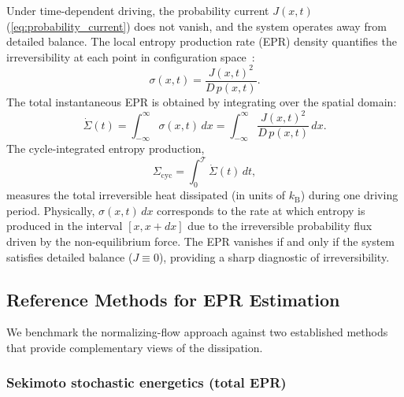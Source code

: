 Under time-dependent driving, the probability current $J(x,t)$ (\cref{eq:probability_current}) does not vanish, and the system operates away from detailed balance.
The local entropy production rate (EPR) density quantifies the irreversibility at each point in configuration space~\cite{Seifert2012}:
\begin{equation}
    \sigma(x,t) = \frac{J(x,t)^2}{D\,p(x,t)}.
    \label{eq:epr_density}
\end{equation}
The total instantaneous EPR is obtained by integrating over the spatial domain:
\begin{equation}
    \dot{\Sigma}(t) = \int_{-\infty}^{\infty}\sigma(x,t)\,dx = \int_{-\infty}^{\infty}\frac{J(x,t)^2}{D\,p(x,t)}\,dx.
    \label{eq:epr_total}
\end{equation}
The cycle-integrated entropy production,
\begin{equation}
    \Sigma_{\mathrm{cyc}} = \int_0^{\mathcal{T}} \dot{\Sigma}(t)\,dt,
    \label{eq:sigma_cycle}
\end{equation}
measures the total irreversible heat dissipated (in units of $k_{\mathrm{B}}$) during one driving period.
Physically, $\sigma(x,t)\,dx$ corresponds to the rate at which entropy is produced in the interval $[x, x+dx]$ due to the irreversible probability flux driven by the non-equilibrium force.
The EPR vanishes if and only if the system satisfies detailed balance ($J \equiv 0$), providing a sharp diagnostic of irreversibility.


\subsection{Reference Methods for EPR Estimation}
\label{sec:reference_methods}

We benchmark the normalizing-flow approach against two established methods that provide complementary views of the dissipation.

\subsubsection{Sekimoto stochastic energetics (total EPR)}
\label{sec:sekimoto}


